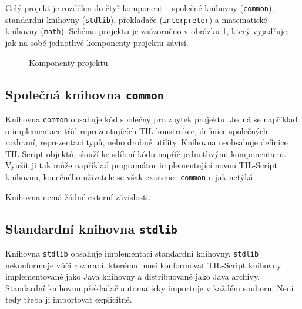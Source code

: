 Celý projekt je rozdělen do čtyř komponent -- společné knihovny (\lstinline{common}), standardní
knihovny (\lstinline{stdlib}), překladače (\lstinline{interpreter}) a matematické knihovny
(\lstinline{math}). Schéma projektu je znázorněno v obrázku \ref{fig:project-structure}, který
vyjadřuje, jak na sobě jednotlivé komponenty projektu závisí.

\begin{figure}
    \centering
    \caption{Komponenty projektu}
    \label{fig:project-structure}
\end{figure}

\subsection{Společná knihovna \lstinline{common}}

Knihovna \lstinline{common} obsahuje kód společný pro zbytek projektu. Jedná se například
o implementace tříd reprezentujících TIL konstrukce, definice společných rozhraní, reprezentaci
typů, nebo drobné utility. Knihovna neobsahuje definice TIL-Script objektů, slouží ke sdílení kódu
napříč jednotlivými komponentami. Využít ji tak může například programátor implementující novou
TIL-Script knihovnu, konečného uživatele se však existence \lstinline{common} nijak netýká.

Knihovna nemá žádné externí závislosti.

\subsection{Standardní knihovna \lstinline{stdlib}}

Knihovna \lstinline{stdlib} obsahuje implementaci standardní knihovny. \lstinline{stdlib}
nekonformuje vůči rozhraní, kterému musí konformovat TIL-Script knihovny implementované jako Java
knihovny a distribuované jako Java archivy. Standardní knihovnu překladač automaticky importuje
v každém souboru. Není tedy třeba ji importovat explicitně.

